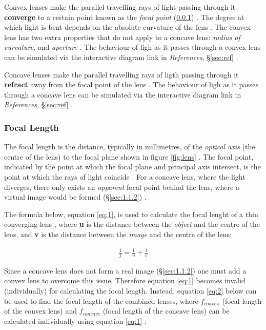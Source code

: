 \documentclass[12pt]{article}
\begin{document}
Convex lenses make the parallel travelling rays of light passing through it \textbf{converge} to a certain point known as the \textit{focal point} (\ref{sec:1.1.1})
\cite{studyconvexlens}.
The degree at which light is bent depends on the absolute curvature of the lens
\cite{shanghaiconvex}.
The convex lens has two extra properties that do not apply to a concave lens: \textit{radius of curvature}, and \textit{aperture}
\cite{geekconvex}.
The behaviour of ligh as it passes through a convex lens can be simulated via the interactive diagram link in \textit{References}, §\ref{sec:ref}
\cite{convexinteract}.

Concave lenses make the parallel travelling rays of ligth passing through it \textbf{refract} away from the focal point of the lens
\cite{studyconvexlens,studyconcavelens}.
The behaviour of ligh as it passes through a concave lens can be simulated via the interactive diagram link in \textit{References}, §\ref{sec:ref}
\cite{concaveinteract}.

\subsubsection{Focal Length} \label{sec:1.1.1}

The focal length is the distance, typically in millimetres, of the \textit{optical axis} (the centre of the lens) to the focal plane shown in figure \ref{fig:lens}
\cite{canonfocal,studyfocal}.
The focal point, indicated by the point at which the focal plane and principal axis intersect, is the point at which the rays of light coincide
\cite{isaaclens}.
For a concave lens, where the light diverges, there only exists an \textit{apparent} focal point behind the lens, where a virtual image would be formed (§\ref{sec:1.1.2})
\cite{isaaclens}.

The formula below, equation \ref{eq:1}, is used to calculate the focal lenght of a thin converging lens \cite{UCDlens,isaaclens}, where \textbf{u} is the distance
between the \textit{object} and the centre of the lens, and \textbf{v} is the distance between the \textit{image} and the centre of the lens:

\begin{gather} \label{eq:1}
    \frac{1}{f} = \frac{1}{u} + \frac{1}{v}
\end{gather}

Since a concave lens does not form a real image (§\ref{sec:1.1.2}) one must add a convex lens to overcome this issue. Therefore equation \ref{eq:1} becomes invalid (individually) for calculating the focal length.
Instead, equation \ref{eq:2} below can be used to find the focal length of the combined lenses, where $f_{convex}$ (focal length of the convex lens) and $f_{concave}$ (focal length of the concave lens) can be calculated individually
using equation \ref{eq:1} \cite{UCDlens}:  
\end{document}
